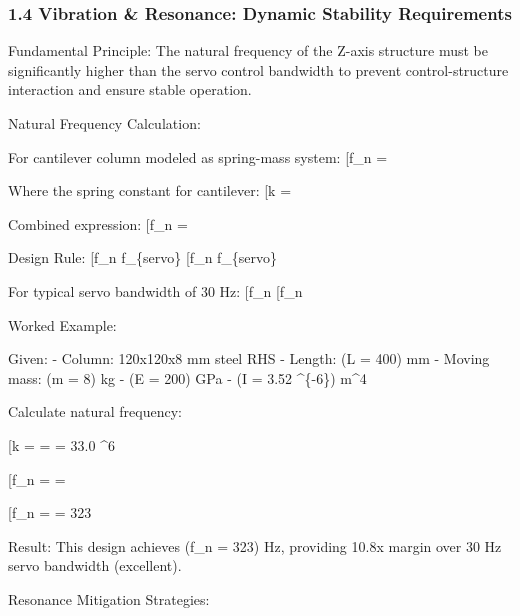 \documentclass[
]{article}
\begin{document}
\subsubsection{1.4 Vibration \& Resonance: Dynamic Stability
Requirements}\label{vibration-resonance-dynamic-stability-requirements}

Fundamental Principle: The natural frequency of the Z-axis structure
must be significantly higher than the servo control bandwidth to prevent
control-structure interaction and ensure stable operation.

Natural Frequency Calculation:

For cantilever column modeled as spring-mass system: {[}f\_n =
\sqrt{\frac{k}{m}}{]}

Where the spring constant for cantilever: {[}k = \frac{3EI}{L^3}{]}

Combined expression: {[}f\_n = \sqrt{\frac{3EI}{mL^3}}{]}

Design Rule: {[}f\_n  \times f\_\{servo\} \text{ (minimum)}{]}
{[}f\_n  \times f\_\{servo\} \text{ (preferred)}{]}

For typical servo bandwidth of 30 Hz: {[}f\_n 
\text{ Hz (minimum)}{]} {[}f\_n  \text{ Hz (preferred)}{]}

Worked Example:

Given: - Column: 120x120x8 mm steel RHS - Length: (L = 400) mm - Moving
mass: (m = 8) kg - (E = 200) GPa - (I = 3.52 \^{}\{-6\}) m\^{}4

Calculate natural frequency:

{[}k = 
=  = 33.0 \^{}6 \text{ N/m}{]}

{[}f\_n =  =
\sqrt{4.125 \times 10^6}{]}

{[}f\_n =  = 323 \text{ Hz}{]}

Result: This design achieves (f\_n = 323) Hz, providing 10.8x margin
over 30 Hz servo bandwidth (excellent).

Resonance Mitigation Strategies:
\end{document}
